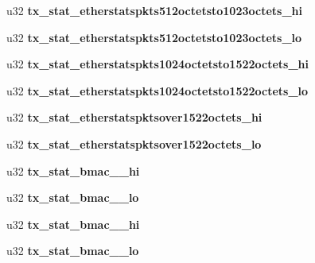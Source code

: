 \begin{DoxyCompactItemize}
\item 
\hypertarget{structmac__stx_aa29b844224c12fc2974b4e1eb1d98bfb}{
u32 {\bfseries tx\_\-stat\_\-etherstatspkts512octetsto1023octets\_\-hi}}
\label{structmac__stx_aa29b844224c12fc2974b4e1eb1d98bfb}

\item 
\hypertarget{structmac__stx_ab933f9c41935eec74cbd761eca080ca9}{
u32 {\bfseries tx\_\-stat\_\-etherstatspkts512octetsto1023octets\_\-lo}}
\label{structmac__stx_ab933f9c41935eec74cbd761eca080ca9}

\item 
\hypertarget{structmac__stx_a82ae6c744725975aadfb5e728e138977}{
u32 {\bfseries tx\_\-stat\_\-etherstatspkts1024octetsto1522octets\_\-hi}}
\label{structmac__stx_a82ae6c744725975aadfb5e728e138977}

\item 
\hypertarget{structmac__stx_ab97926ce183ee84fbf806216c373abd5}{
u32 {\bfseries tx\_\-stat\_\-etherstatspkts1024octetsto1522octets\_\-lo}}
\label{structmac__stx_ab97926ce183ee84fbf806216c373abd5}

\item 
\hypertarget{structmac__stx_a83087ad141e7a0f55c84e2e96ee84f18}{
u32 {\bfseries tx\_\-stat\_\-etherstatspktsover1522octets\_\-hi}}
\label{structmac__stx_a83087ad141e7a0f55c84e2e96ee84f18}

\item 
\hypertarget{structmac__stx_aa1328f8e78911bef94fae405b1d0d4f9}{
u32 {\bfseries tx\_\-stat\_\-etherstatspktsover1522octets\_\-lo}}
\label{structmac__stx_aa1328f8e78911bef94fae405b1d0d4f9}

\item 
\hypertarget{structmac__stx_a51f9f05ba1be2986442c9262feac6fe2}{
u32 {\bfseries tx\_\-stat\_\-bmac\_\_\-hi}}
\label{structmac__stx_a51f9f05ba1be2986442c9262feac6fe2}

\item 
\hypertarget{structmac__stx_a78d8d83faf8064a3bb6417781288087a}{
u32 {\bfseries tx\_\-stat\_\-bmac\_\_\-lo}}
\label{structmac__stx_a78d8d83faf8064a3bb6417781288087a}

\item 
\hypertarget{structmac__stx_a29f3da0a97dbebdd91fbdf9b3419e512}{
u32 {\bfseries tx\_\-stat\_\-bmac\_\_\-hi}}
\label{structmac__stx_a29f3da0a97dbebdd91fbdf9b3419e512}

\item 
\hypertarget{structmac__stx_a718538f3e33f178b5603e2d0871db073}{
u32 {\bfseries tx\_\-stat\_\-bmac\_\_\-lo}}
\label{structmac__stx_a718538f3e33f178b5603e2d0871db073}


\end{DoxyCompactItemize}
